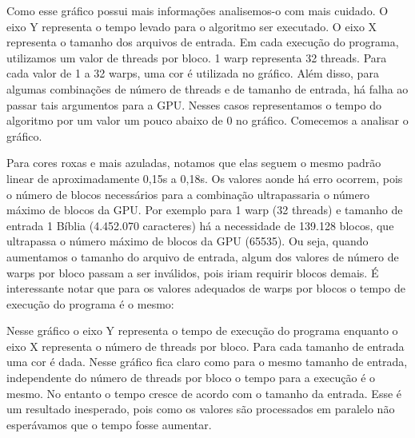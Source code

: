 \documentclass[12pt]{article}
\begin{document}
Como esse gráfico possui mais informações analisemos-o com mais cuidado.
O eixo Y representa o tempo levado para o algoritmo ser executado.
O eixo X representa o tamanho dos arquivos de entrada. Em cada execução
do programa, utilizamos um valor de threads por bloco. 1 warp 
representa 32 threads. Para cada valor de 1 a 32 warps, uma cor é
utilizada no gráfico. Além disso, para algumas combinações de número de
threads e de tamanho de entrada, há falha ao passar tais argumentos
para a GPU. Nesses casos representamos o tempo do algoritmo por um valor
um pouco abaixo de 0 no gráfico. Comecemos a analisar o gráfico.

Para cores roxas e mais azuladas, notamos que elas seguem o mesmo padrão
linear de aproximadamente 0,15s a 0,18s. Os valores aonde há erro
ocorrem, pois o número de blocos necessários para a combinação
ultrapassaria o número máximo de blocos da GPU. Por exemplo para 1 warp
(32 threads) e tamanho de entrada 1 Bíblia (4.452.070 caracteres) há a
necessidade de 139.128 blocos, que ultrapassa o número máximo de blocos
da GPU (65535). Ou seja, quando aumentamos o tamanho do arquivo de
entrada, algum dos valores de número de warps por bloco passam a ser
inválidos, pois iriam requirir blocos demais. É interessante notar que
para os valores adequados de warps por blocos o tempo de execução do
programa é o mesmo:

\begin{figure}[H]
\end{figure}

Nesse gráfico o eixo Y representa o tempo de execução do programa
enquanto o eixo X representa o número de threads por bloco. Para cada
tamanho de entrada uma cor é dada. Nesse gráfico fica claro como para o
mesmo tamanho de entrada, independente do número de threads por bloco o
tempo para a execução é o mesmo. No entanto o tempo cresce de acordo com
o tamanho da entrada. Esse é um resultado inesperado, pois como os 
valores são processados em paralelo não esperávamos que o tempo fosse
aumentar.
\end{document}
